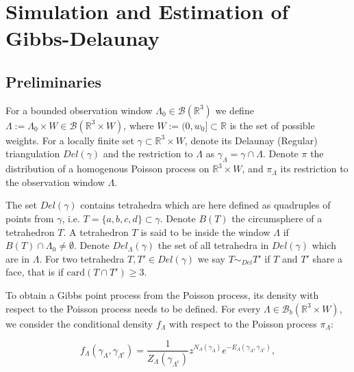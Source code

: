 \documentclass[12pt,a4paper]{report}
\begin{document}
\chapter{Simulation and Estimation of Gibbs-Delaunay}


\section{Preliminaries}

For a bounded observation window $\Lambda_0 \in\mathcal B(\mathbb R^3)$ we  define  $\Lambda := \Lambda_0 \times W \in \mathcal B(\mathbb R^3 \times W)$, where  $W:=(0,w_0]\subset \mathbb R$ is the set of possible weights. For a locally finite set $\gamma\subset \mathbb R^3\times W $, denote its Delaunay (Regular) triangulation $Del(\gamma)$ and the restriction to $\Lambda$ as  $\gamma_\Lambda = \gamma \cap \Lambda$. Denote $\pi$ the distribution of a homogenous Poisson process on $\mathbb R^3 \times W$, and $\pi_\Lambda$ its restriction to the observation window $\Lambda$. 

The set $Del(\gamma)$ contains tetrahedra which are here defined as quadruples of points from $\gamma$, i.e. $T=\{a,b,c,d\}\subset \gamma$. Denote $B(T)$ the circumsphere of a tetrahedron $T$. A tetrahedron $T$ is said to be inside the window $\Lambda$ if $B(T)\cap \Lambda_0 \neq \emptyset$. Denote $Del_\Lambda(\gamma)$ the set of all tetrahedra in $Del(\gamma)$ which are in $\Lambda$. For two tetrahedra $T,T'\in Del(\gamma)$ we say $T\sim_{Del} T'$ if $T$ and $T'$ share a face, that is if $\text{card}(T\cap T') \geq 3$. 

To obtain a Gibbs point process from the Poisson process, its density with respect to the Poisson process needs to be defined. For every $\Lambda \in \mathcal B_b(\mathbb R^3\times W)$, we consider the conditional density $f_\Lambda$ with respect to the Poisson process $\pi_\Lambda$:

$$ f_\Lambda(\gamma_\Lambda, \gamma_{\Lambda^c}) = \frac 1{Z_\Lambda(\gamma_{\Lambda^c})} z^{N_\Lambda(\gamma_\Lambda)} e^{-E_\Lambda (\gamma_\Lambda, \gamma_{\Lambda^c})},$$ 
\end{document}
